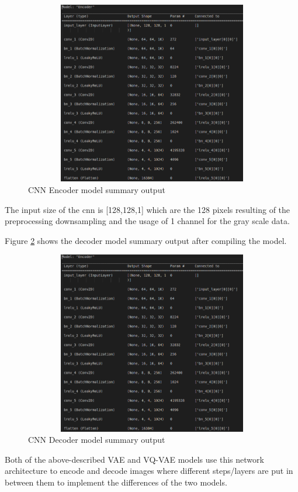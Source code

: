 \begin{figure}[ht]
    \centering
    \includegraphics[width = 14cm, height = 8cm]{images/cnn-encoder-output.png}
    \caption[]{CNN Encoder model summary output}
    \label{fig:cnnencoderoutput}
\end{figure}

The input size of the \acrshort*{cnn} is [128,128,1] which are the 128 pixels resulting of the preprocessing downsampling and the usage of 1 channel for the gray scale data.

Figure \ref{fig:cnndecoderoutput} shows the decoder model summary output after compiling the model.

\begin{figure}[ht]
    \centering
    \includegraphics[width = 14cm, height = 8cm]{images/cnn-encoder-output.png}
    \caption[]{CNN Decoder model summary output}
    \label{fig:cnndecoderoutput}
\end{figure}

Both of the above-described VAE and VQ-VAE models use this network architecture to encode and decode images where different steps/layers are put in between them to implement the differences of the two models.

